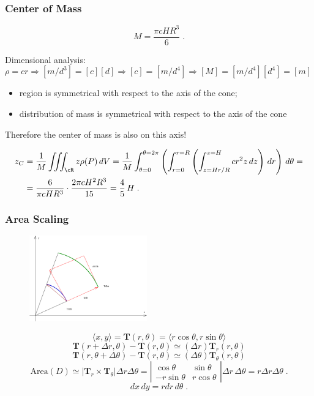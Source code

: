 \begin{frame}
  \frametitle{Center of Mass}

$$M = \frac{\pi c H R^3}{6}\; .$$

Dimensional analysis:
%
$$\rho = c r \Longrightarrow [m/d^3] = [c][d] \Longrightarrow [c] = [m/d^4] \Longrightarrow [M] = [m/d^4][d^4] = [m] \;  $$
%

\begin{itemize}
\item region is symmetrical with respect to the axis of the cone;
\item distribution of mass is symmetrical with respect to the axis of the cone
\end{itemize}

Therefore the center of mass is also on this axis!

%
\begin{align*}
  z_C & = \frac{1}{M}  \int\!\!\!\int\!\!\!\int_{\cR} z \rho(P) \, dV = \frac{1}{M} \int_{\theta =0}^{\theta=2\pi} \left( \int_{r=0}^{r=R} \left( \int_{z=Hr/R}^{z=H} cr^2z \, dz \right) \, dr \right) \, d\theta = \\
  & = \frac{6}{\pi c H R^3}\cdot \frac{2\pi c H^2 R^3}{15} = \frac{4}{5}\, H\; .
\end{align*}
\end{frame}

\begin{frame}
\frametitle{Area Scaling}
\begin{figure}
        \includegraphics[width=2in]{../images/polar_element_area.eps}
    \end{figure}
%
$$\langle x, y \rangle = \textbf{T}(r,\theta) = \langle r\cos\theta, r\sin\theta\rangle$$
%
$$\textbf{T}(r+\Delta r,\theta)-\textbf{T}(r,\theta) \simeq (\Delta r) \textbf{T}_r(r,\theta)$$
%
$$\textbf{T}(r,\theta+\Delta \theta)-\textbf{T}(r,\theta) \simeq (\Delta \theta) \textbf{T}_\theta(r,\theta)$$
%
$$\text{Area}(D) \simeq |\textbf{T}_r \times \textbf{T}_\theta |\Delta r \Delta \theta =
\left|
\begin{array}{cc}
  \cos{\theta} & \sin{\theta} \\
  -r\sin{\theta} & r\cos{\theta}
\end{array}
\right| \Delta r\, \Delta \theta = r\Delta r \Delta \theta \; .$$
%
$$dx\,dy = r dr\, d\theta\; .$$
%
\end{frame}


